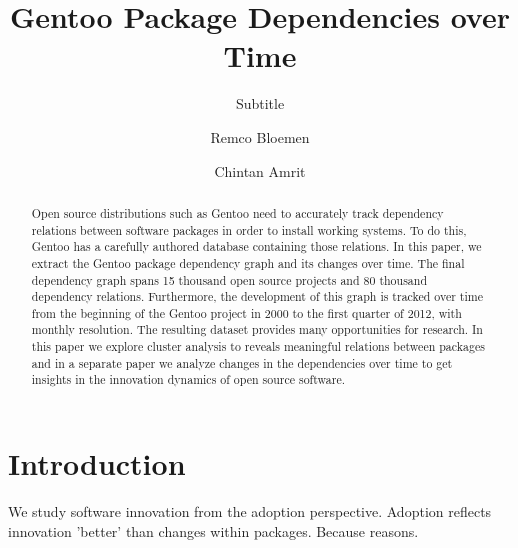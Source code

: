 \documentclass[smallextended,final]{svjour3}
\begin{document}
\title{Gentoo Package Dependencies over Time}
\subtitle{Subtitle}
\dedication{}
\author{Remco Bloemen \and Chintan Amrit}

\maketitle

\tableofcontents

\begin{abstract}
Open source distributions such as Gentoo need to accurately track dependency relations between software packages in order to install working systems. To do this, Gentoo has a carefully authored database containing those relations. In this paper, we extract the Gentoo package dependency graph and its changes over time. The final dependency graph spans 15 thousand open source projects and 80 thousand dependency relations. Furthermore, the development of this graph is tracked over time from the beginning of the Gentoo project in 2000 to the first quarter of 2012, with monthly resolution. The resulting dataset provides many opportunities for research. In this paper we explore cluster analysis to reveals meaningful relations between packages and in a separate paper we analyze changes in the dependencies over time to get insights in the innovation dynamics of open source software.
\end{abstract}


\section{Introduction}

We study software innovation from the adoption perspective. Adoption reflects innovation 'better' than changes within packages. Because reasons.
\end{document}
